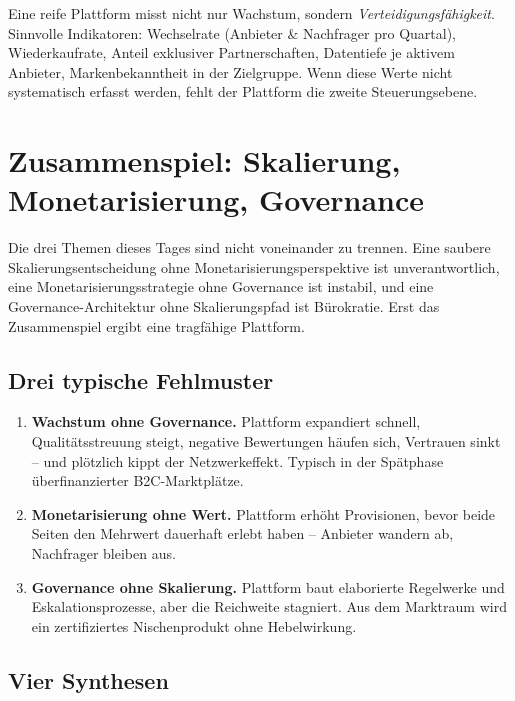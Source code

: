 \documentclass[11pt,a4paper,oneside]{article}
\begin{document}
\begin{merkbox}
Eine reife Plattform misst nicht nur Wachstum, sondern \emph{Verteidigungsfähigkeit}. Sinnvolle Indikatoren: Wechselrate (Anbieter \& Nachfrager pro Quartal), Wiederkaufrate, Anteil exklusiver Partnerschaften, Datentiefe je aktivem Anbieter, Markenbekanntheit in der Zielgruppe. Wenn diese Werte nicht systematisch erfasst werden, fehlt der Plattform die zweite Steuerungsebene.
\end{merkbox}

\section{Zusammenspiel: Skalierung, Monetarisierung, Governance}

Die drei Themen dieses Tages sind nicht voneinander zu trennen. Eine saubere Skalierungsentscheidung ohne Monetarisierungsperspektive ist unverantwortlich, eine Monetarisierungsstrategie ohne Governance ist instabil, und eine Governance-Architektur ohne Skalierungspfad ist Bürokratie. Erst das Zusammenspiel ergibt eine tragfähige Plattform.

\subsection{Drei typische Fehlmuster}

\begin{enumerate}
  \item \textbf{Wachstum ohne Governance.} Plattform expandiert schnell, Qualitätsstreuung steigt, negative Bewertungen häufen sich, Vertrauen sinkt -- und plötzlich kippt der Netzwerkeffekt. Typisch in der Spätphase überfinanzierter B2C-Marktplätze.
  \item \textbf{Monetarisierung ohne Wert.} Plattform erhöht Provisionen, bevor beide Seiten den Mehrwert dauerhaft erlebt haben -- Anbieter wandern ab, Nachfrager bleiben aus.
  \item \textbf{Governance ohne Skalierung.} Plattform baut elaborierte Regelwerke und Eskalationsprozesse, aber die Reichweite stagniert. Aus dem Marktraum wird ein zertifiziertes Nischenprodukt ohne Hebelwirkung.
\end{enumerate}

\subsection{Vier Synthesen}
\end{document}
